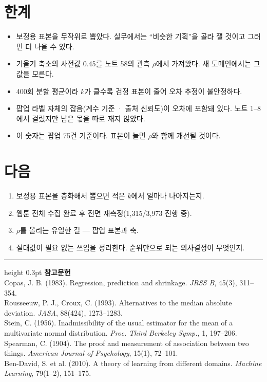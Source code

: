 \documentclass[10pt]{article}
\begin{document}

\section{한계}

\begin{itemize}[leftmargin=1.1em,itemsep=0.15em]
\item 보정용 표본을 무작위로 뽑았다. 실무에서는 ``비슷한 기획''을 골라 잴 것이고
      그러면 더 나을 수 있다.
\item 기울기 축소의 사전값 0.45를 노트 58의 관측 $\rho$에서 가져왔다. 새 도메인에서는
      그 값을 모른다.
\item 400회 분할 평균이라 $k$가 클수록 검정 표본이 줄어 오차 추정이 불안정하다.
\item 팝업 라벨 자체의 잡음(계수 기준 · 출처 신뢰도)이 오차에 포함돼 있다.
      노트 1--8에서 걸렀지만 남은 몫을 따로 재지 않았다.
\item 이 숫자는 팝업 75건 기준이다. 표본이 늘면 $\rho$와 함께 개선될 것이다.
\end{itemize}

\section{다음}

\begin{enumerate}[leftmargin=1.3em,itemsep=0.15em]
\item 보정용 표본을 층화해서 뽑으면 적은 $k$에서 얼마나 나아지는지.
\item 웹툰 전체 수집 완료 후 전면 재측정(1,315/3,973 진행 중).
\item $\rho$를 올리는 유일한 길 --- 팝업 표본과 축.
\item 절대값이 필요 없는 쓰임을 정리한다. 순위만으로 되는 의사결정이 무엇인지.
\end{enumerate}

\vspace{0.6em}
\hrule height 0.3pt
\vspace{0.5em}
{\footnotesize
\textbf{참고문헌}\\[0.3em]
Copas, J. B. (1983). Regression, prediction and shrinkage. \emph{JRSS B},
45(3), 311--354.\\[0.15em]
Rousseeuw, P. J., Croux, C. (1993). Alternatives to the median absolute deviation.
\emph{JASA}, 88(424), 1273--1283.\\[0.15em]
Stein, C. (1956). Inadmissibility of the usual estimator for the mean of a
multivariate normal distribution. \emph{Proc. Third Berkeley Symp.}, 1, 197--206.\\[0.15em]
Spearman, C. (1904). The proof and measurement of association between two things.
\emph{American Journal of Psychology}, 15(1), 72--101.\\[0.15em]
Ben-David, S. et al. (2010). A theory of learning from different domains.
\emph{Machine Learning}, 79(1--2), 151--175.
}
\end{document}
